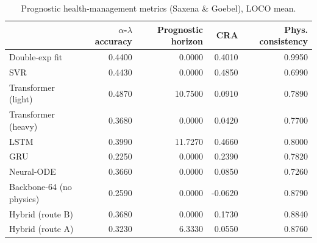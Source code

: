 \begin{table}
\caption{Prognostic health-management metrics (Saxena \& Goebel), LOCO mean.}
\label{tab:phm_prognostic_metrics}
\begin{tabular}{lrrrr}
\toprule
 & $\alpha$-$\lambda$ accuracy & Prognostic horizon & CRA & Phys. consistency \\
\midrule
Double-exp fit & 0.4400 & 0.0000 & 0.4010 & 0.9950 \\
SVR & 0.4430 & 0.0000 & 0.4850 & 0.6990 \\
Transformer (light) & 0.4870 & 10.7500 & 0.0910 & 0.7890 \\
Transformer (heavy) & 0.3680 & 0.0000 & 0.0420 & 0.7700 \\
LSTM & 0.3990 & 11.7270 & 0.4660 & 0.8000 \\
GRU & 0.2250 & 0.0000 & 0.2390 & 0.7820 \\
Neural-ODE & 0.3660 & 0.0000 & 0.0850 & 0.7260 \\
Backbone-64 (no physics) & 0.2590 & 0.0000 & -0.0620 & 0.8790 \\
Hybrid (route B) & 0.3680 & 0.0000 & 0.1730 & 0.8840 \\
Hybrid (route A) & 0.3230 & 6.3330 & 0.0550 & 0.8760 \\
\bottomrule
\end{tabular}
\end{table}
